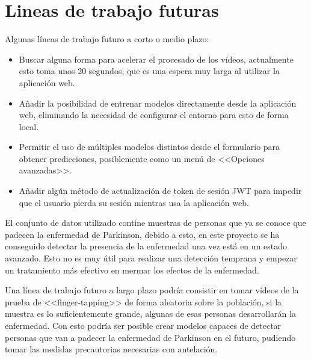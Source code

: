 \section{Lineas de trabajo futuras}

Algunas líneas de trabajo futuro a corto o medio plazo:

\begin{itemize}
    \item Buscar alguna forma para acelerar el procesado de los vídeos,
    actualmente esto toma unos 20 segundos, que es una espera muy larga al
    utilizar la aplicación web.
    \item Añadir la posibilidad de entrenar modelos directamente desde la
    aplicación web, eliminando la necesidad de configurar el entorno para esto
    de forma local.
    \item Permitir el uso de múltiples modelos distintos desde el formulario
    para obtener predicciones, posiblemente como un menú de <<Opciones
    avanzadas>>.
    \item Añadir algún método de actualización de token de sesión JWT para
    impedir que el usuario pierda su sesión mientras usa la aplicación web.
\end{itemize}

El conjunto de datos utilizado contine muestras de personas que ya se conoce que
padecen la enfermedad de Parkinson, debido a esto, en este proyecto se ha
conseguido detectar la presencia de la enfermedad una vez está en un estado
avanzado. Esto no es muy útil para realizar una detección temprana y empezar un
tratamiento más efectivo en mermar los efectos de la enfermedad.

Una línea de trabajo futuro a largo plazo podría consistir en tomar vídeos de la
prueba de <<finger-tapping>> de forma aleatoria sobre la población, si la
muestra es lo suficientemente grande, algunas de esas personas desarrollarán la
enfermedad. Con esto podría ser posible crear modelos capaces de detectar
personas que van a padecer la enfermedad de Parkinson en el futuro, pudiendo
tomar las medidas precautorias necesarias con antelación.
